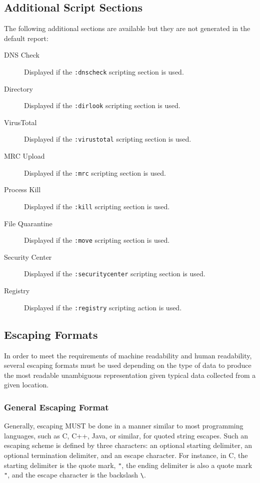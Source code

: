 \subsection{Additional Script Sections}
\noindent{}The following additional sections are available but they are not
generated in the default report:
\begin{description}
\item[DNS Check] Displayed if the \verb|:dnscheck| scripting section is used.
\item[Directory] Displayed if the \verb|:dirlook| scripting section is used.
\item[VirusTotal] Displayed if the \verb|:virustotal| scripting section is used.
\item[MRC Upload] Displayed if the \verb|:mrc| scripting section is used.
\item[Process Kill] Displayed if the \verb|:kill| scripting section is used.
\item[File Quarantine] Displayed if the \verb|:move| scripting section is used.
\item[Security Center] Displayed if the \verb|:securitycenter| scripting section
is used.
\item[Registry] Displayed if the \verb|:registry| scripting action is used.
\end{description}

\subsection{Escaping Formats}
In order to meet the requirements of machine readability and human readability,
several escaping formats must be used depending on the type of data to produce
the most readable unambiguous representation given typical data collected from a
given location.

\subsubsection{General Escaping Format}
Generally, escaping MUST be done in a manner similar to most programming
languages, such as C, C++, Java, or similar, for quoted string escapes. Such an
escaping scheme is defined by three characters: an optional starting delimiter,
an optional termination delimiter, and an escape character. For instance, in C,
the starting delimiter is the quote mark, \verb|"|, the ending delimiter is also
a quote mark \verb|"|, and the escape character is the backslash \verb|\|.

